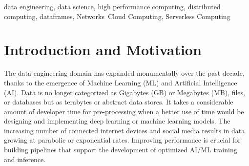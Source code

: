 \documentclass[conference]{IEEEtran}
\begin{document}
\maketitle
\begin{abstract}
    Data is found everywhere, from health and human infrastructure to the surge of sensors and the proliferation of internet-connected devices. To meet this challenge, the data engineering field has expanded significantly in recent years in both research and industry. Traditionally, data engineering, Machine Learning, and AI workloads have been run on large clusters within data center environments, requiring substantial investment in hardware and maintenance. With the rise of the public cloud, it is now possible to run large applications across nodes without owning or maintaining hardware. \textbf{Serverless functions such as AWS Lambda provide horizontal scaling and precise billing without the hassle of managing traditional cloud infrastructure. However, when processing large datasets, users often rely on external storage options that are significantly slower than direct communication typical of HPC clusters.  We introduce Cylon, a high-performance distributed data frame solution that has shown promising results for data processing using Python. We describe how we took inspiration from the FMI library and designed a serverless communicator to tackle communication and performance issues associated with serverless functions.
    With our design, we demonstrate that the scaling efficiency of AWS Lambda achieves within 6.5\% of serverful AWS (EC2) at 64 nodes, based on implementing direct communication via NAT Traversal TCP Hole Punching.}
\end{abstract}

\begin{IEEEkeywords}
data engineering, data science, high performance computing, distributed computing, dataframes, Networks~Cloud Computing, Serverless Computing
\end{IEEEkeywords}
\section{Introduction and Motivation}\label{sec:intro}
The data engineering domain has expanded monumentally over the past decade, thanks to the emergence of Machine Learning (ML) and Artificial Intelligence (AI). Data is no longer categorized as Gigabytes (GB) or Megabytes (MB), files, or databases but as terabytes or abstract data stores. It takes a considerable amount of developer time for pre-processing when a better use of time would be designing and implementing deep learning or machine learning models. The increasing number of connected internet devices and social media results in data growing at parabolic or exponential rates.  Improving performance is crucial for building pipelines that support the development of optimized AI/ML training and inference.
\end{document}
